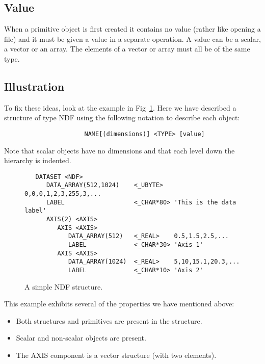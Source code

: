 \subsection {Value}

When a primitive object is first created it contains no value (rather like
opening a file) and it must be given a value in a separate operation. A value
can be a scalar, a vector or an array. The elements of a vector or array must
all be of the same type.

\subsection{Illustration}

To fix these ideas, look at the example in Fig~\ref{fig:ndf}. Here we have
described a structure of type NDF using the following notation to describe each
object: 

\small
\begin{verbatim} 
                      NAME[(dimensions)] <TYPE> [value]
\end{verbatim}
\normalsize

Note that scalar objects have no dimensions and that each level down the
hierarchy is indented. 

\begin{figure}[h]
\small
\begin{verbatim}
   DATASET <NDF>
      DATA_ARRAY(512,1024)    <_UBYTE>   0,0,0,1,2,3,255,3,...
      LABEL                   <_CHAR*80> 'This is the data label'
      AXIS(2) <AXIS>
         AXIS <AXIS>
            DATA_ARRAY(512)   <_REAL>    0.5,1.5,2.5,...
            LABEL             <_CHAR*30> 'Axis 1'
         AXIS <AXIS>
            DATA_ARRAY(1024)  <_REAL>    5,10,15.1,20.3,...
            LABEL             <_CHAR*10> 'Axis 2'
\end{verbatim}
\normalsize
\caption{A simple NDF structure.}
\label{fig:ndf}
\end{figure}

This example exhibits several of the properties we have mentioned above:

\begin{itemize}
\item Both structures and primitives are present in the structure.
\item Scalar and non-scalar objects are present.
\item The AXIS component is a vector structure (with two elements).
\end{itemize}


